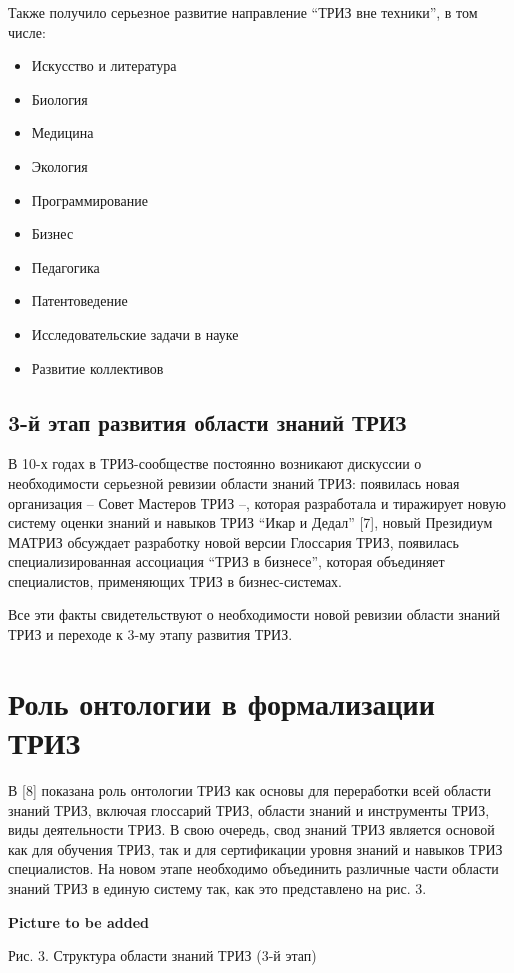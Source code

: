 \documentclass[11pt,a4paper]{article}
\newcommand{\addpicture}{\textbf{Picture to be added}\par}
\begin{document}
Также получило серьезное развитие направление “ТРИЗ вне техники”, в том числе:
\begin{itemize}[noitemsep]
\item Искусство и литература
\item Биология
\item Медицина
\item Экология
\item Программирование
\item Бизнес
\item Педагогика
\item Патентоведение
\item Исследовательские задачи в науке
\item Развитие коллективов
\end{itemize}

\subsection{3-й этап развития области знаний ТРИЗ}

В 10-х годах в ТРИЗ-сообществе постоянно возникают дискуссии о необходимости
серьезной ревизии области знаний ТРИЗ: появилась новая организация -- Совет
Мастеров ТРИЗ --, которая разработала и тиражирует новую систему оценки знаний
и навыков ТРИЗ “Икар и Дедал” [7], новый Президиум МАТРИЗ обсуждает разработку
новой версии Глоссария ТРИЗ, появилась специализированная ассоциация “ТРИЗ в
бизнесе”, которая объединяет специалистов, применяющих ТРИЗ в бизнес-системах.

Все эти факты свидетельствуют о необходимости новой ревизии области знаний
ТРИЗ и переходе к 3-му этапу развития ТРИЗ.

\section{Роль онтологии в формализации ТРИЗ}

В [8] показана роль онтологии ТРИЗ как основы для переработки всей области
знаний ТРИЗ, включая глоссарий ТРИЗ, области знаний и инструменты ТРИЗ, виды
деятельности ТРИЗ. В свою очередь, свод знаний ТРИЗ является основой как для
обучения ТРИЗ, так и для сертификации уровня знаний и навыков ТРИЗ
специалистов. На новом этапе необходимо объединить различные части области
знаний ТРИЗ в единую систему так, как это представлено на рис. 3.

\begin{center}
  \addpicture
  Рис. 3. Структура области знаний ТРИЗ (3-й этап)
\end{center}
\end{document}
